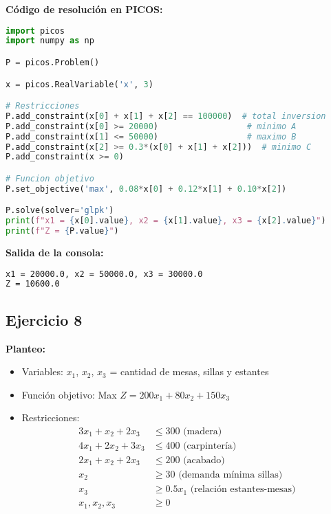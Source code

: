 \documentclass[12pt]{article}
\begin{document}
\textbf{Código de resolución en PICOS:}
\begin{lstlisting}[language=Python]
import picos
import numpy as np

P = picos.Problem()

x = picos.RealVariable('x', 3)

# Restricciones
P.add_constraint(x[0] + x[1] + x[2] == 100000)  # total inversion
P.add_constraint(x[0] >= 20000)                  # minimo A
P.add_constraint(x[1] <= 50000)                  # maximo B
P.add_constraint(x[2] >= 0.3*(x[0] + x[1] + x[2]))  # minimo C
P.add_constraint(x >= 0)

# Funcion objetivo
P.set_objective('max', 0.08*x[0] + 0.12*x[1] + 0.10*x[2])

P.solve(solver='glpk')
print(f"x1 = {x[0].value}, x2 = {x[1].value}, x3 = {x[2].value}")
print(f"Z = {P.value}")
\end{lstlisting}

\textbf{Salida de la consola:}
\begin{lstlisting}[language=bash,backgroundcolor=\color{black},basicstyle=\color{white}\ttfamily,numbers=none]
x1 = 20000.0, x2 = 50000.0, x3 = 30000.0
Z = 10600.0
\end{lstlisting}

\subsection*{Ejercicio 8}

\textbf{Planteo:}
\begin{itemize}
\item Variables: $x_1$, $x_2$, $x_3$ = cantidad de mesas, sillas y estantes
\item Función objetivo: Max $Z = 200x_1 + 80x_2 + 150x_3$
\item Restricciones:
  \begin{align*}
  3x_1 + x_2 + 2x_3 &\leq 300 \text{ (madera)} \\
  4x_1 + 2x_2 + 3x_3 &\leq 400 \text{ (carpintería)} \\
  2x_1 + x_2 + 2x_3 &\leq 200 \text{ (acabado)} \\
  x_2 &\geq 30 \text{ (demanda mínima sillas)} \\
  x_3 &\geq 0.5x_1 \text{ (relación estantes-mesas)} \\
  x_1, x_2, x_3 &\geq 0
  \end{align*}
\end{itemize}
\end{document}
